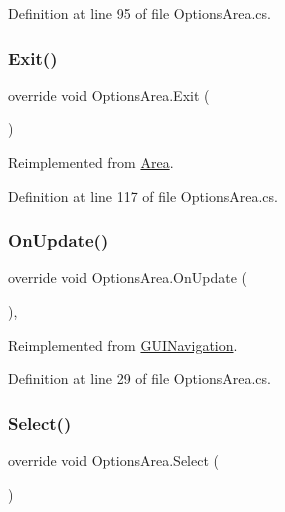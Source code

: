 Definition at line 95 of file Options\+Area.\+cs.

\mbox{\label{class_options_area_a8a38de01790a717037f8c3aae3e83b85}} 
\subsubsection{\texorpdfstring{Exit()}{Exit()}}
{\footnotesize\ttfamily override void Options\+Area.\+Exit (\begin{DoxyParamCaption}{ }\end{DoxyParamCaption})\hspace{0.3cm}{\ttfamily [virtual]}}



Reimplemented from \mbox{\hyperlink{class_area_a96ef46550ca800c223f4db8f0b93e86b}{Area}}.



Definition at line 117 of file Options\+Area.\+cs.

\mbox{\label{class_options_area_af06ad11cd346ebbc8c4f3314471710b3}} 
\subsubsection{\texorpdfstring{On\+Update()}{OnUpdate()}}
{\footnotesize\ttfamily override void Options\+Area.\+On\+Update (\begin{DoxyParamCaption}{ }\end{DoxyParamCaption})\hspace{0.3cm}{\ttfamily [protected]}, {\ttfamily [virtual]}}



Reimplemented from \mbox{\hyperlink{class_g_u_i_navigation_aad668226e400889bceea3914750b949e}{G\+U\+I\+Navigation}}.



Definition at line 29 of file Options\+Area.\+cs.

\mbox{\label{class_options_area_a2dc4be3a6a17378055632ac3d0c124e7}} 
\subsubsection{\texorpdfstring{Select()}{Select()}}
{\footnotesize\ttfamily override void Options\+Area.\+Select (\begin{DoxyParamCaption}{ }\end{DoxyParamCaption})\hspace{0.3cm}{\ttfamily [virtual]}}



